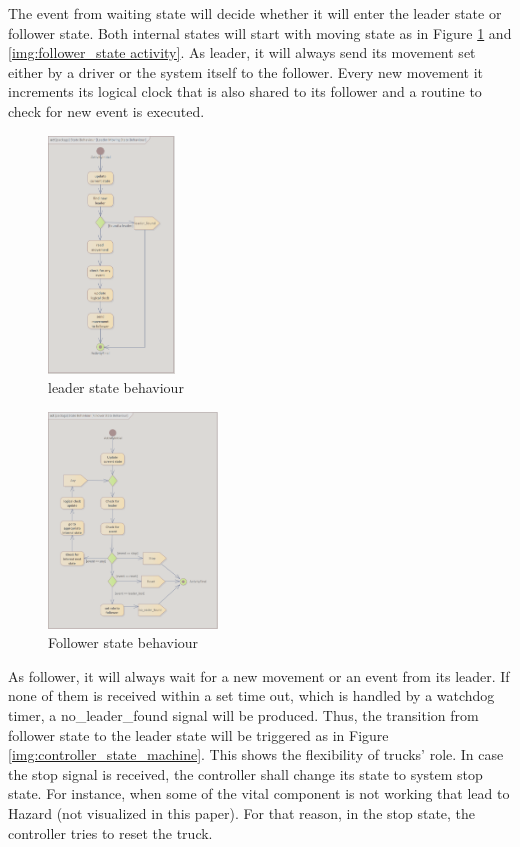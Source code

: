 The event from waiting state will decide whether it will enter the leader state or follower state.  Both internal states will start with moving state as in Figure \ref{img:leader_state_activity} and \ref{img:follower_state activity}. As leader, it will always send its movement set either by a driver or the system itself to the follower. Every new movement it increments its logical clock that is also shared to its follower and a routine to check for new event is executed. 
\begin{figure}[ht]
    \centering
    \includegraphics[width=0.3\textwidth]{images/leader_state_activity.png}
    \caption{ leader state behaviour}
    \label{img:leader_state_activity}
\end{figure}


\begin{figure}[ht]
    \centering
    \includegraphics[width=0.4\textwidth]{images/follower_state_activity.png}
    \caption{ Follower state behaviour}
    \label{img:follower_state_activity}
\end{figure}

As follower, it will always wait for a new movement or an event from its leader. If none of them is received within a set time out, which is handled by a watchdog timer, a no\_leader\_found signal will be produced. Thus, the transition from follower state to the leader state will be triggered as in Figure \ref{img:controller_state_machine}. This shows the flexibility of trucks’ role.
In case the stop signal is received, the controller shall change its state to system stop state. For instance, when some of the vital component is not working that lead to Hazard (not visualized in this paper). For that reason, in the stop state, the controller tries to reset the truck.

